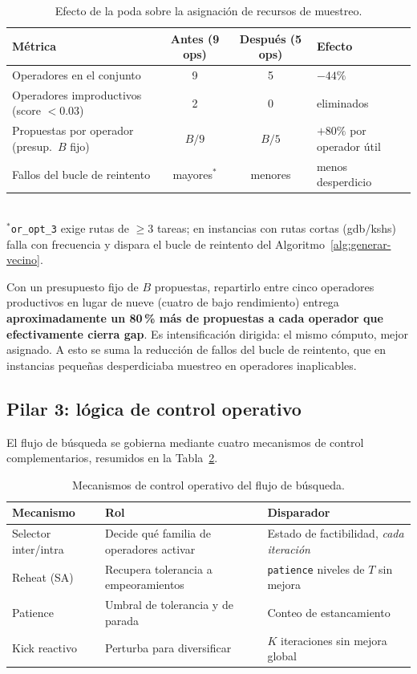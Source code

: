 \begin{table}[h]
\centering
\caption{Efecto de la poda sobre la asignación de recursos de muestreo.}
\label{tab:concentracion-presupuesto}
\small
\begin{tabular}{lccl}
\toprule
Métrica & Antes (9 ops) & Después (5 ops) & Efecto \\
\midrule
Operadores en el conjunto        & 9   & 5   & $-44\%$ \\
Operadores improductivos (score $<0.03$) & 2 & 0 & eliminados \\
Propuestas por operador (presup.\ $B$ fijo) & $B/9$ & $B/5$ & $+80\%$ por operador útil \\
Fallos del bucle de reintento    & mayores$^*$ & menores & menos desperdicio \\
\bottomrule
\end{tabular}
\\[4pt]
\footnotesize $^*$\texttt{or\_opt\_3} exige rutas de $\geq 3$ tareas; en
instancias con rutas cortas (gdb/kshs) falla con frecuencia y dispara el
bucle de reintento del Algoritmo~\ref{alg:generar-vecino}.
\end{table}

Con un presupuesto fijo de $B$ propuestas, repartirlo entre cinco
operadores productivos en lugar de nueve (cuatro de bajo rendimiento)
entrega \textbf{aproximadamente un 80\,\% más de propuestas a cada operador
que efectivamente cierra gap}. Es intensificación dirigida: el mismo
cómputo, mejor asignado. A esto se suma la reducción de fallos del bucle de
reintento, que en instancias pequeñas desperdiciaba muestreo en operadores
inaplicables.

\subsection{Pilar 3: lógica de control operativo}
\label{subsec:pilar-control}

El flujo de búsqueda se gobierna mediante cuatro mecanismos de control
complementarios, resumidos en la Tabla~\ref{tab:mecanismos-control}.

\begin{table}[h]
\centering
\caption{Mecanismos de control operativo del flujo de búsqueda.}
\label{tab:mecanismos-control}
\small
\begin{tabular}{lp{4.3cm}p{4.6cm}}
\toprule
Mecanismo & Rol & Disparador \\
\midrule
Selector inter/intra & Decide qué familia de operadores activar & Estado de factibilidad, \emph{cada iteración} \\
Reheat (SA) & Recupera tolerancia a empeoramientos & \texttt{patience} niveles de $T$ sin mejora \\
Patience & Umbral de tolerancia y de parada & Conteo de estancamiento \\
Kick reactivo & Perturba para diversificar & $K$ iteraciones sin mejora global \\
\bottomrule
\end{tabular}
\end{table}

